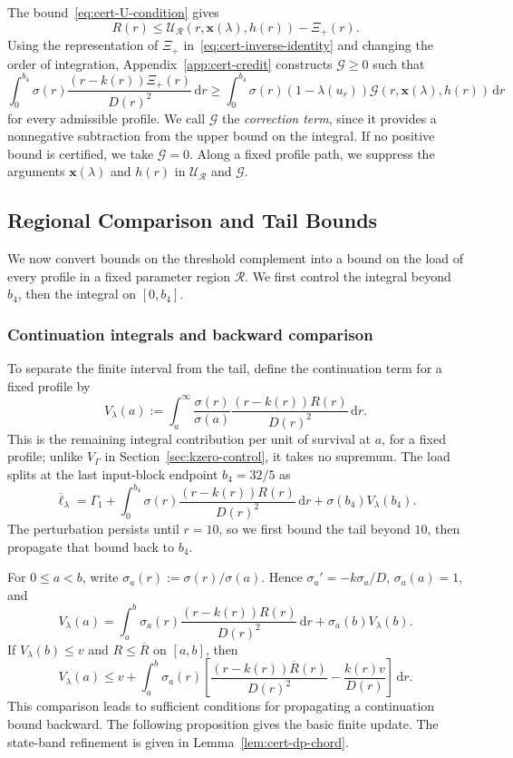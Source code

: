 \documentclass[11pt]{article}
\theoremstyle{definition}
\theoremstyle{remark}
\newcommand{\dd}{\,\mathrm d}
\begin{document}
The bound~\eqref{eq:cert-U-condition} gives
\[
 R(r)\le
 \mathcal U_{\mathcal R}(r,\mathbf x(\lambda),h(r))-\Xi_+(r).
\]
Using the representation of $\Xi_+$ in~\eqref{eq:cert-inverse-identity}
and changing the order of integration, Appendix~\ref{app:cert-credit}
constructs $\mathcal G\ge0$ such that
\begin{equation}\label{eq:cert-credit-integrated}
 \int_0^{b_4}\sigma(r)\frac{(r-k(r))\Xi_+(r)}{D(r)^2}\dd r
 \ge\int_0^{b_4}\sigma(r)(1-\lambda(u_r))
 \mathcal G(r,\mathbf x(\lambda),h(r))\dd r
\end{equation}
for every admissible profile.  We call $\mathcal G$ the
\emph{correction term}, since it provides a nonnegative subtraction
from the upper bound on the integral.  If no positive bound is certified,
we take $\mathcal G=0$.  Along a fixed profile path, we suppress the arguments
$\mathbf x(\lambda)$ and $h(r)$ in $\mathcal U_{\mathcal R}$ and $\mathcal G$.

\subsection{Regional Comparison and Tail Bounds}
\label{app:cert-regional-comparison}\label{app:cert-bellman}

We now convert bounds on the threshold complement into a bound on the
load of every profile in a fixed parameter region $\mathcal R$.
We first control the integral beyond $b_4$, then the integral on $[0,b_4]$.

\subsubsection{Continuation integrals and backward comparison}

To separate the finite interval from the tail, define the continuation
term for a fixed profile by
\[
 V_\lambda(a):=
 \int_a^\infty
 \frac{\sigma(r)}{\sigma(a)}
 \frac{(r-k(r))R(r)}{D(r)^2}\dd r.
\]
This is the remaining integral contribution per unit of survival at
$a$, for a fixed profile; unlike $V_\Gamma$ in
Section~\ref{sec:kzero-control}, it takes no supremum.
The load splits at the last input-block endpoint $b_4=32/5$ as
\[
 \overline\ell_\lambda
 =\Gamma_1+
 \int_0^{b_4}\sigma(r)\frac{(r-k(r))R(r)}{D(r)^2}\dd r
 +\sigma(b_4)V_\lambda(b_4).
\]
The perturbation persists until $r=10$, so we first bound the tail
beyond $10$, then propagate that bound back to $b_4$.

For $0\le a<b$, write $\sigma_a(r):=\sigma(r)/\sigma(a)$.  Hence
$\sigma_a'=-k\sigma_a/D$, $\sigma_a(a)=1$, and
\[
 V_\lambda(a)
 =\int_a^b \sigma_a(r)\frac{(r-k(r))R(r)}{D(r)^2}\dd r
 +\sigma_a(b)V_\lambda(b).
\]
If $V_\lambda(b)\le v$ and $R\le\overline R$ on $[a,b]$, then
\begin{equation}\label{eq:cert-direct-one-step}
 V_\lambda(a)
 \le v+\int_a^b \sigma_a(r)
 \left[
 \frac{(r-k(r))\overline R(r)}{D(r)^2}
 -\frac{k(r)v}{D(r)}
 \right]\dd r.
\end{equation}
This comparison leads to sufficient conditions for propagating a
continuation bound backward.  The following proposition gives the basic finite update.
The state-band refinement is given in Lemma~\ref{lem:cert-dp-chord}.
\end{document}

